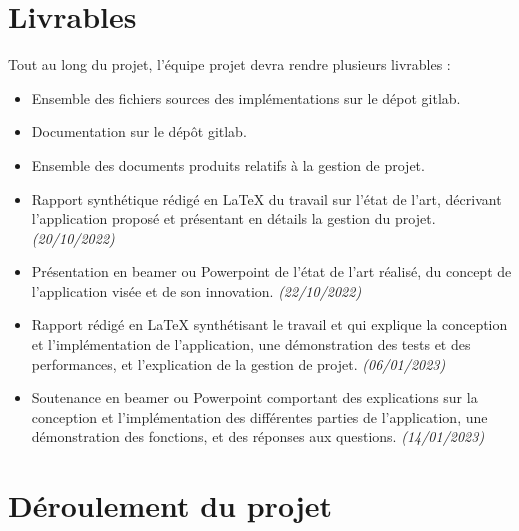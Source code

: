 \documentclass{report}
\begin{document}
    \section{Livrables}
    Tout au long du projet, l'équipe projet devra rendre plusieurs livrables :
    \begin{itemize}
        \item Ensemble des fichiers sources des implémentations sur le dépot gitlab.
        \item Documentation sur le dépôt gitlab.
        \item Ensemble des documents produits relatifs à la gestion de projet.
        \item Rapport synthétique rédigé en LaTeX du travail sur l'état de l'art, décrivant l'application proposé et présentant en détails la gestion du projet. \textit{(20/10/2022)}
        \item Présentation en beamer ou Powerpoint de l'état de l'art réalisé, du concept de l'application visée et de son innovation. \textit{(22/10/2022)}
        \item Rapport rédigé en LaTeX synthétisant le travail et qui explique la conception et l'implémentation de l'application, une démonstration des tests et des performances, et l'explication de la gestion de projet. \textit{(06/01/2023)}
        \item Soutenance en beamer ou Powerpoint comportant des explications sur la conception et l'implémentation des différentes parties de l'application, une démonstration des fonctions, et des réponses aux questions. \textit{(14/01/2023)}
        
    \end{itemize}




\section{Déroulement du projet}
\end{document}

